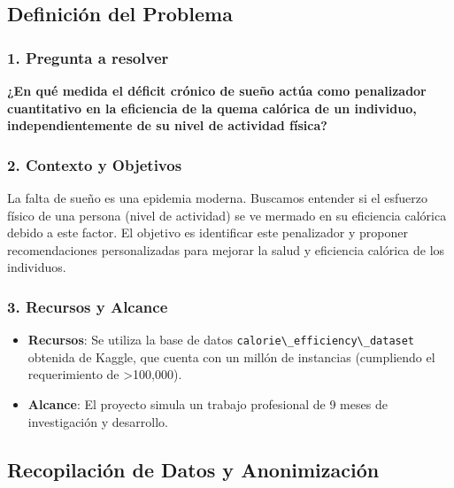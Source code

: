 \label{820c4b3b}
\subsection{Definición del Problema}\label{definiciuxf3n-del-problema}

\subsubsection{1. Pregunta a resolver}\label{1-pregunta-a-resolver}

\textbf{¿En qué medida el déficit crónico de sueño actúa como
   penalizador cuantitativo en la eficiencia de la quema calórica de un
   individuo, independientemente de su nivel de actividad física?}

\subsubsection{2. Contexto y Objetivos}\label{2-contexto-y-objetivos}

La falta de sueño es una epidemia moderna. Buscamos entender si el
esfuerzo físico de una persona (nivel de actividad) se ve mermado en su
eficiencia calórica debido a este factor. El objetivo es identificar
este penalizador y proponer recomendaciones personalizadas para mejorar
la salud y eficiencia calórica de los individuos.

\subsubsection{3. Recursos y Alcance}\label{3-recursos-y-alcance}

\begin{itemize}
   \tightlist
   \item
         \textbf{Recursos}: Se utiliza la base de datos
         \passthrough{\lstinline!calorie\_efficiency\_dataset!} obtenida de
         Kaggle, que cuenta con un millón de instancias (cumpliendo el
         requerimiento de \textgreater100,000).
   \item
         \textbf{Alcance}: El proyecto simula un trabajo profesional de 9 meses
         de investigación y desarrollo.
\end{itemize}

\label{6eabcbb1}
\subsection{Recopilación de Datos y
   Anonimización}\label{recopilaciuxf3n-de-datos-y-anonimizaciuxf3n}

